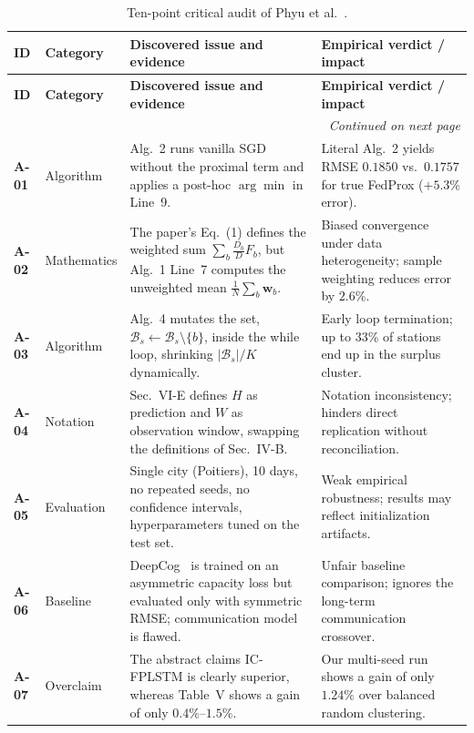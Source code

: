 \documentclass[11pt,a4paper]{article}
\begin{document}
{\footnotesize
\begin{longtable}{@{}p{0.95cm}p{1.9cm}p{6.0cm}p{5.2cm}@{}}
\caption{Ten-point critical audit of Phyu et al.~\cite{phyu2023multi}.}
\label{tab:audit_matrix}\\
\toprule
\textbf{ID} & \textbf{Category} & \textbf{Discovered issue and evidence} & \textbf{Empirical verdict / impact} \\
\midrule
\endfirsthead
\toprule
\textbf{ID} & \textbf{Category} & \textbf{Discovered issue and evidence} & \textbf{Empirical verdict / impact} \\
\midrule
\endhead
\midrule
\multicolumn{4}{r}{\emph{Continued on next page}}\\
\endfoot
\bottomrule
\endlastfoot
\textbf{A-01} & Algorithm & Alg.~2 runs vanilla SGD without the proximal term and applies a post-hoc $\arg\min$ in Line~9. & Literal Alg.~2 yields RMSE $0.1850$ vs.\ $0.1757$ for true FedProx ($+5.3\%$ error). \\[3pt]
\textbf{A-02} & Mathematics & The paper's Eq.~(1) defines the weighted sum $\sum_b \tfrac{D_b}{D} F_b$, but Alg.~1 Line~7 computes the unweighted mean $\tfrac{1}{N}\sum_b \mathbf{w}_b$. & Biased convergence under data heterogeneity; sample weighting reduces error by $2.6\%$. \\[3pt]
\textbf{A-03} & Algorithm & Alg.~4 mutates the set, $\mathcal{B}_s \leftarrow \mathcal{B}_s \setminus \{b\}$, inside the while loop, shrinking $|\mathcal{B}_s|/K$ dynamically. & Early loop termination; up to $33\%$ of stations end up in the surplus cluster. \\[3pt]
\textbf{A-04} & Notation & Sec.~VI-E defines $H$ as prediction and $W$ as observation window, swapping the definitions of Sec.~IV-B. & Notation inconsistency; hinders direct replication without reconciliation. \\[3pt]
\textbf{A-05} & Evaluation & Single city (Poitiers), 10 days, no repeated seeds, no confidence intervals, hyperparameters tuned on the test set. & Weak empirical robustness; results may reflect initialization artifacts. \\[3pt]
\textbf{A-06} & Baseline & DeepCog~\cite{bega2019deepcog} is trained on an asymmetric capacity loss but evaluated only with symmetric RMSE; communication model is flawed. & Unfair baseline comparison; ignores the long-term communication crossover. \\[3pt]
\textbf{A-07} & Overclaim & The abstract claims IC-FPLSTM is clearly superior, whereas Table~V shows a gain of only $0.4\%$--$1.5\%$. & Our multi-seed run shows a gain of only $1.24\%$ over balanced random clustering. \\[3pt]

\end{longtable}}
\end{document}
